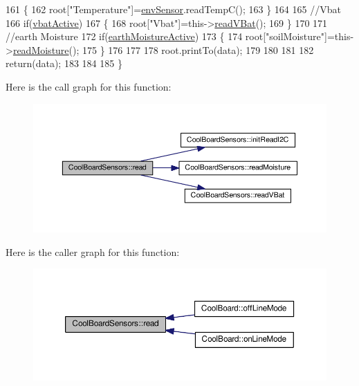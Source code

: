 \begin{DoxyCode}
161     \{
162         root[\textcolor{stringliteral}{"Temperature"}]=\hyperlink{classCoolBoardSensors_a868e38985e9a2412829fa2790ca13e2e}{envSensor}.readTempC();
163     \}
164     
165     \textcolor{comment}{//Vbat}
166     \textcolor{keywordflow}{if}(\hyperlink{classCoolBoardSensors_af5039ad760b0ff0aa7eee16c55e81702}{vbatActive})    
167     \{   
168         root[\textcolor{stringliteral}{"Vbat"}]=this->\hyperlink{classCoolBoardSensors_a6944b6ea7bce8e2fce1b434acfd9d5f3}{readVBat}();
169     \}
170     
171     \textcolor{comment}{//earth Moisture}
172     \textcolor{keywordflow}{if}(\hyperlink{classCoolBoardSensors_a46dfddb8a12720e92cd2825ef09023c8}{earthMoistureActive})
173     \{   
174         root[\textcolor{stringliteral}{"soilMoisture"}]=this->\hyperlink{classCoolBoardSensors_a8761bff50373c485f4465c8db47d0633}{readMoisture}();
175     \}
176     
177     
178     root.printTo(data);
179     
180 
181 
182     \textcolor{keywordflow}{return}(data);
183     
184 
185 \}
\end{DoxyCode}
Here is the call graph for this function\+:
\nopagebreak
\begin{figure}[H]
\begin{center}
\leavevmode
\includegraphics[width=350pt]{classCoolBoardSensors_a91badb2539d91fda8679f2a597874c48_cgraph}
\end{center}
\end{figure}
Here is the caller graph for this function\+:
\nopagebreak
\begin{figure}[H]
\begin{center}
\leavevmode
\includegraphics[width=350pt]{classCoolBoardSensors_a91badb2539d91fda8679f2a597874c48_icgraph}
\end{center}
\end{figure}
\mbox{\label{classCoolBoardSensors_a8761bff50373c485f4465c8db47d0633}} 
